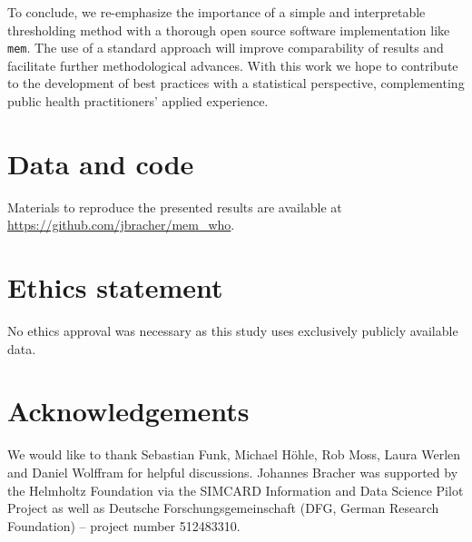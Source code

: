 \documentclass{article}
\begin{document}

To conclude, we re-emphasize the importance of a simple and interpretable thresholding method with a thorough open source software implementation like \texttt{mem}. The use of a standard approach will improve comparability of results and facilitate further methodological advances. With this work we hope to contribute to the development of best practices  with a statistical perspective, complementing public health practitioners' applied experience.


\section*{Data and code}

Materials to reproduce the presented results are available at \url{https://github.com/jbracher/mem_who}.

\section*{Ethics statement}

No ethics approval was necessary as this study uses exclusively publicly available data.





\section*{Acknowledgements}

We would like to thank Sebastian Funk, Michael H\"ohle, Rob Moss, Laura Werlen and Daniel Wolffram for helpful discussions. Johannes Bracher was supported by the Helmholtz Foundation via the SIMCARD Information and Data Science Pilot Project as well as Deutsche Forschungsgemeinschaft (DFG, German Research Foundation) -- project number 512483310.
\end{document}
